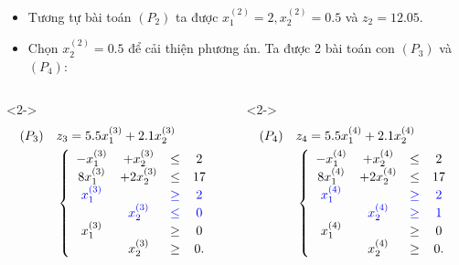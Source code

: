 \documentclass[10pt]{beamer}
\begin{document}
\begin{frame}
    \begin{itemize}
    \item <1-> Tương tự bài toán $(P_2)$ ta được $x^{(2)}_1 = 2, x^{(2)}_2 = 0.5$ và $z_2=12.05$.
    \bigskip
    \item <2-> Chọn $x^{(2)}_2 = 0.5$ để cải thiện phương án. Ta được 2 bài toán con $(P_3)$ và $(P_4)$:
    \end{itemize}
    \bigskip
    \begin{columns}
\begin{column}{0.5\textwidth}<2->
    \small
    \begin{equation*}
        \begin{split}
            (P_3) \quad &z_3= 5.5x^{(3)}_1 + 2.1x^{(3)}_2 \\
            & \left\{\begin{array} {cccc}
             -x^{(3)}_1 &+ x^{(3)}_2 &\leq& 2 \\
             8x^{(3)}_1 &+ 2x^{(3)}_2 &\leq& 17 \\
             \color{blue} x^{(3)}_1&& \color{blue}\geq &\color{blue}2 \\
             &\color{blue} x^{(3)}_2& \color{blue}\leq& \color{blue}0 \\
            x^{(3)}_1 &&\geq &0 \\
            &x^{(3)}_2 &\geq &0. \\
            \end{array}\right. \\
        \end{split}
    \end{equation*}
\end{column}
\begin{column}{0.5\textwidth}<2->
   \small
   \begin{equation*}
        \begin{split}
            (P_4) \quad &z_4= 5.5x^{(4)}_1 + 2.1x^{(4)}_2  \\
            & \left\{\begin{array} {cccc}
             -x^{(4)}_1 &+ x^{(4)}_2 &\leq& 2 \\
             8x^{(4)}_1 &+ 2x^{(4)}_2 &\leq& 17 \\
             \color{blue} x^{(4)}_1 &&\color{blue}\geq& \color{blue}2 \\
             &\color{blue} x^{(4)}_2 &\color{blue}\geq&\color{blue} 1 \\
            x^{(4)}_1 &&\geq& 0 \\
            &x^{(4)}_2 &\geq& 0. \\
            \end{array}\right. \\
        \end{split}
    \end{equation*}
\end{column}
\end{columns}
\end{frame}
\end{document}
